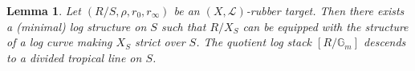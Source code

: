 \documentclass[a4paper,12pt]{article} %
\newcommand{\MWvone}[1]{}%
\newcommand{\MWref}[1]{#1}
\newcommand{\bb}[1]{{\mathbb{#1}}}
\newcommand{\ca}[1]{{\mathcal{#1}}}
\theoremstyle{definition}
\theoremstyle{plain}%
\newtheorem{lemma}[definition]{Lemma}
\begin{document}
\begin{lemma}\label{bbll}
Let $(R/S, \rho, r_0, r_\infty)$ be an $(X, \ca L)$-rubber target. Then there exists a (minimal) log structure on $S$ such that $R/X_S$ can be equipped with the structure of  a log curve making $X_S$ strict over $S$. The quotient log stack $[R/\bb G_m]$ descends to a divided tropical line on $S$.  
\end{lemma}
\end{document}
